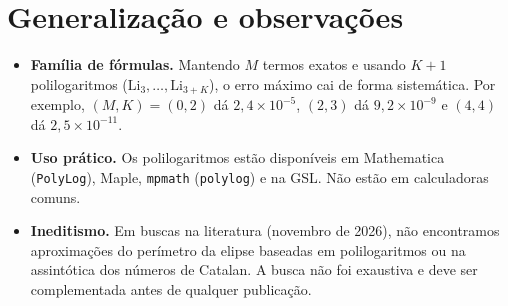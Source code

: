 \documentclass[11pt,a4paper]{article}
\theoremstyle{remark}
\begin{document}
\section{Generalização e observações}

\begin{itemize}
\item \textbf{Família de fórmulas.} Mantendo $M$ termos exatos e usando $K+1$
polilogaritmos ($\mathrm{Li}_3,\dots,\mathrm{Li}_{3+K}$), o erro máximo cai
de forma sistemática. Por exemplo, $(M,K)=(0,2)$ dá $2{,}4\times10^{-5}$,
$(2,3)$ dá $9{,}2\times10^{-9}$ e $(4,4)$ dá $2{,}5\times10^{-11}$.
\item \textbf{Uso prático.} Os polilogaritmos estão disponíveis em
Mathematica (\texttt{PolyLog}), Maple, \texttt{mpmath} (\texttt{polylog}) e
na GSL. Não estão em calculadoras comuns.
\item \textbf{Ineditismo.} Em buscas na literatura (novembro de 2026), não
encontramos aproximações do perímetro da elipse baseadas em polilogaritmos ou
na assintótica dos números de Catalan. A busca não foi exaustiva e deve ser
complementada antes de qualquer publicação.
\end{itemize}
\end{document}
